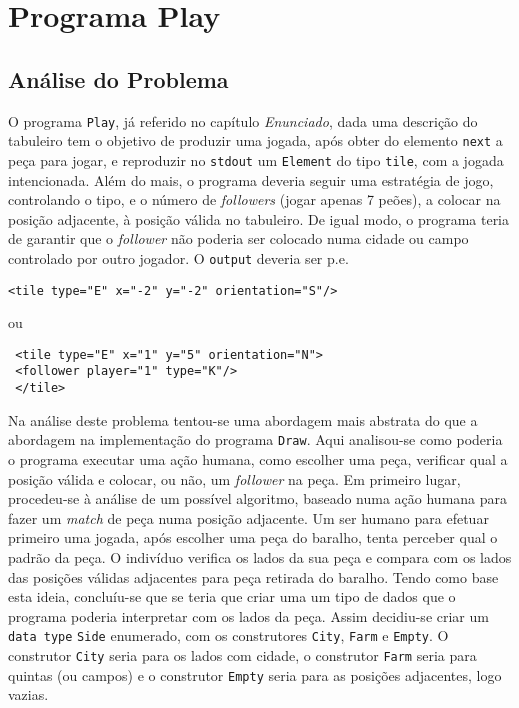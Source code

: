 \chapter{Programa Play}

\section{Análise do Problema}




O programa \texttt{Play}, já referido no capítulo \emph{Enunciado}, dada uma descrição do tabuleiro tem o
objetivo de produzir uma jogada, após obter do elemento \texttt{next} a peça para jogar, e reproduzir no
\texttt{stdout} um \texttt{Element} do tipo \texttt{tile}, com a jogada intencionada. Além do mais, o
programa deveria seguir uma estratégia de jogo, controlando o tipo, e o número de \emph{followers} (jogar
apenas 7 peões), a colocar na posição adjacente, à posição válida no tabuleiro. De igual modo, o
programa teria de garantir que o \emph{follower} não poderia ser colocado numa cidade ou campo controlado por
outro jogador. O \texttt{output} deveria ser p.e.

\begin{verbatim} 
<tile type="E" x="-2" y="-2" orientation="S"/> 
\end{verbatim}

ou

\begin{verbatim}
 <tile type="E" x="1" y="5" orientation="N">
 <follower player="1" type="K"/>
 </tile>
\end{verbatim}


Na análise deste problema tentou-se uma abordagem mais abstrata do que a abordagem na implementação do
programa \texttt{Draw}. Aqui analisou-se como poderia o programa executar uma ação humana, como escolher uma
peça, verificar qual a posição válida e colocar, ou não, um \emph{follower} na peça. Em primeiro lugar,
procedeu-se à análise de um possível algoritmo, baseado numa ação humana para fazer um \emph{match} de
peça numa posição adjacente. Um ser humano para efetuar primeiro uma jogada, após escolher uma peça do
baralho, tenta perceber qual o padrão da peça. O indivíduo verifica os lados da sua peça e compara com os
lados das posições válidas adjacentes para peça retirada do baralho. Tendo como base esta ideia,
concluíu-se que se teria que criar uma um tipo de dados que o programa poderia interpretar com os lados
da peça. Assim decidiu-se criar um \texttt{data type} \texttt{Side} enumerado, com os construtores
\texttt{City}, \texttt{Farm} e \texttt{Empty}. O construtor \texttt{City} seria para os lados com cidade, o
construtor \texttt{Farm} seria para quintas (ou campos) e o construtor \texttt{Empty} seria para as posições
adjacentes, logo vazias.


